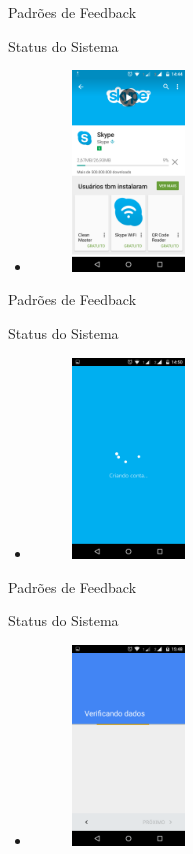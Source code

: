 \begin{frame}{Padrões de Feedback}
\begin{block}{Status do Sistema}
  \begin{itemize}
    \item<1-> \begin{figure}
    \includegraphics[width=3cm]{figuras/status/status}
    \end{figure}
  \end{itemize}
\end{block}
\end{frame}

\begin{frame}{Padrões de Feedback}
\begin{block}{Status do Sistema}
  \begin{itemize}
    \item<1-> \begin{figure}
    \includegraphics[width=3cm]{figuras/status/status1}
    \end{figure}
  \end{itemize}
\end{block}
\end{frame}

\begin{frame}{Padrões de Feedback}
\begin{block}{Status do Sistema}
  \begin{itemize}
    \item<1-> \begin{figure}
    \includegraphics[width=3cm]{figuras/status/status2}
    \end{figure}
  \end{itemize}
\end{block}
\end{frame}
